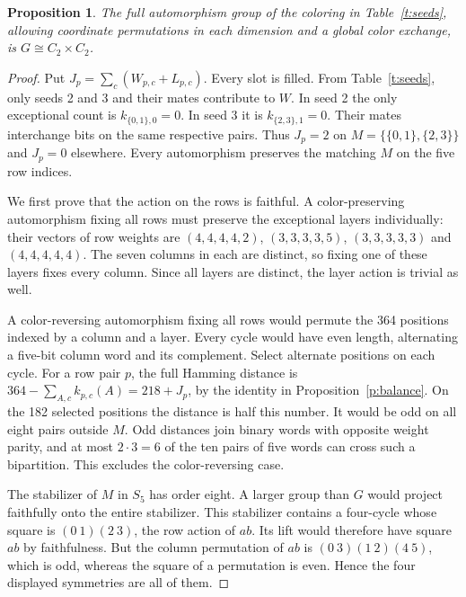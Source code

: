\documentclass[11pt]{article}
\newtheorem{proposition}[theorem]{Proposition}
\begin{document}
\begin{proposition}\label{p:aut}
The full automorphism group of the coloring in Table~\ref{t:seeds}, allowing coordinate permutations in each dimension and a global color exchange, is $G\cong C_2\times C_2$.
\end{proposition}
\begin{proof}
Put $J_p=\sum_c(W_{p,c}+L_{p,c})$. Every slot is filled. From Table~\ref{t:seeds}, only seeds 2 and 3 and their mates contribute to $W$. In seed 2 the only exceptional count is $k_{\{0,1\},0}=0$. In seed 3 it is $k_{\{2,3\},1}=0$. Their mates interchange bits on the same respective pairs. Thus $J_p=2$ on $M=\{\{0,1\},\{2,3\}\}$ and $J_p=0$ elsewhere. Every automorphism preserves the matching $M$ on the five row indices.

We first prove that the action on the rows is faithful. A color-preserving automorphism fixing all rows must preserve the exceptional layers individually: their vectors of row weights are $(4,4,4,4,2)$, $(3,3,3,3,5)$, $(3,3,3,3,3)$ and $(4,4,4,4,4)$. The seven columns in each are distinct, so fixing one of these layers fixes every column. Since all layers are distinct, the layer action is trivial as well.

A color-reversing automorphism fixing all rows would permute the 364 positions indexed by a column and a layer. Every cycle would have even length, alternating a five-bit column word and its complement. Select alternate positions on each cycle. For a row pair $p$, the full Hamming distance is $364-\sum_{A,c} k_{p,c}(A)=218+J_p$, by the identity in Proposition~\ref{p:balance}. On the 182 selected positions the distance is half this number. It would be odd on all eight pairs outside $M$. Odd distances join binary words with opposite weight parity, and at most $2\cdot3=6$ of the ten pairs of five words can cross such a bipartition. This excludes the color-reversing case.

The stabilizer of $M$ in $S_5$ has order eight. A larger group than $G$ would project faithfully onto the entire stabilizer. This stabilizer contains a four-cycle whose square is $(0\ 1)(2\ 3)$, the row action of $ab$. Its lift would therefore have square $ab$ by faithfulness. But the column permutation of $ab$ is $(0\ 3)(1\ 2)(4\ 5)$, which is odd, whereas the square of a permutation is even. Hence the four displayed symmetries are all of them.
\end{proof}
\end{document}
